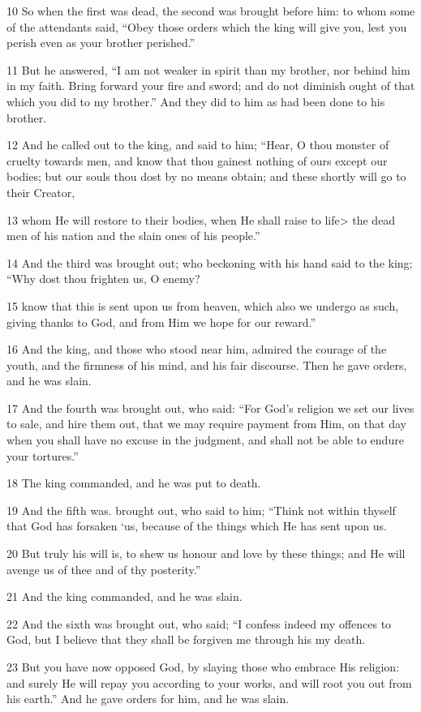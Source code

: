 10 So when the first was dead, the second was brought before him: to whom some of the attendants said, “Obey those orders which the king will give you, lest you perish even as your brother perished.” 

11 But he answered, “I am not weaker in spirit than my brother, nor behind him in my faith. Bring forward your fire and sword; and do not diminish ought of that which you did to my brother.” And they did to him as had been done to his brother. 

12 And he called out to the king, and said to him; “Hear, O thou monster of cruelty towards men, and know that thou gainest nothing of ours except our bodies; but our souls thou dost by no means obtain; and these shortly will go to their Creator, 

13 whom He will restore to their bodies, when He shall raise to life> the dead men of his nation and the slain ones of his people.” 

14 And the third was brought out; who beckoning with his hand said to the king; “Why dost thou frighten us, O enemy? 

15 know that this is sent upon us from heaven, which also we undergo as such, giving thanks to God, and from Him we hope for our reward.” 

16 And the king, and those who stood near him, admired the courage of the youth, and the firmness of his mind, and his fair discourse. Then he gave orders, and he was slain. 

17 And the fourth was brought out, who said: “For God’s religion we set our lives to sale, and hire them out, that we may require payment from Him, on that day when you shall have no excuse in the judgment, and shall not be able to endure your tortures.” 

18 The king commanded, and he was put to death. 

19 And the fifth was. brought out, who said to him; “Think not within thyself that God has forsaken ‘us, because of the things which He has sent upon us. 

20 But truly his will is, to shew us honour and love by these things; and He will avenge us of thee and of thy posterity.” 

21 And the king commanded, and he was slain. 

22 And the sixth was brought out, who said; “I confess indeed my offences to God, but I believe that they shall be forgiven me through his my death. 

23 But you have now opposed God, by slaying those who embrace His religion: and surely He will repay you according to your works, and will root you out from his earth.” And he gave orders for him, and he was slain. 


